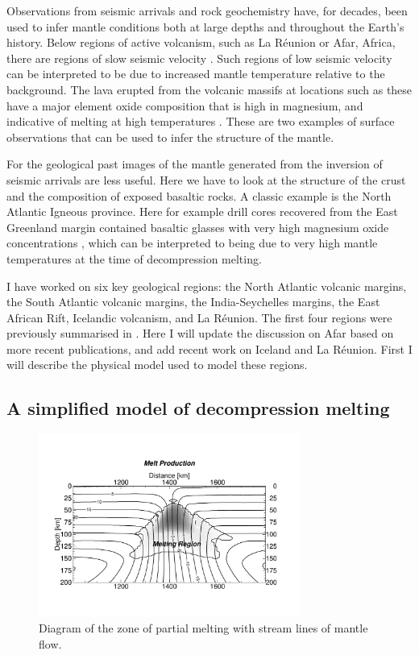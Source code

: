 Observations from seismic arrivals and rock geochemistry have, for decades, been used to infer mantle conditions both at large depths and throughout the Earth's history. Below regions of active volcanism, such as La Réunion or Afar, Africa, there are regions of slow seismic velocity \citep[e.g.][]{mazzullo-etal-2017,bastow-etal-2005}. Such regions of low seismic velocity can be interpreted to be due to increased mantle temperature relative to the background. The lava erupted from the volcanic massifs at locations such as these have a major element oxide composition that is high in magnesium, and indicative of melting at high temperatures \citep[e.g.]{rooney-etal-2012,herzberg-etal-2007}. These are two examples of surface observations that can be used to infer the structure of the mantle.

For the geological past images of the mantle generated from the inversion of seismic arrivals are less useful. Here we have to look at the structure of the crust and the composition of exposed basaltic rocks. A classic example is the North Atlantic Igneous province. Here for example drill cores recovered from the East Greenland margin contained basaltic glasses with very high magnesium oxide concentrations \citep{fitton-etal-1998}, which can be interpreted to being due to very high mantle temperatures at the time of decompression melting.

I have worked on six key geological regions: the North Atlantic volcanic margins, the South Atlantic volcanic margins, the India-Seychelles margins, the East African Rift, Icelandic volcanism, and La Réunion. The first four regions were previously summarised in \cite{armitage-2018}. Here I will update the discussion on Afar based on more recent publications, and add recent work on Iceland and La Réunion. First I will describe the physical model used to model these regions.

\subsection{A simplified model of decompression melting}

\begin{figure}
\centering
\includegraphics[width=8.6cm]{./figures/ch2-melt-region.pdf}
\caption{Diagram of the zone of partial melting with stream lines of mantle flow.}
\label{fg:melt-region}
\end{figure}

